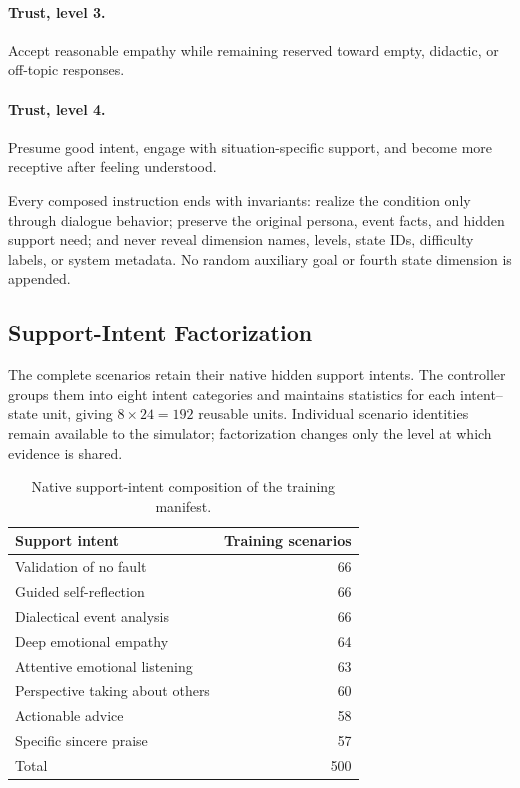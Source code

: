 \paragraph{Trust, level 3.}
Accept reasonable empathy while remaining reserved toward empty, didactic, or
off-topic responses.
\paragraph{Trust, level 4.}
Presume good intent, engage with situation-specific support, and become more
receptive after feeling understood.

Every composed instruction ends with invariants: realize the condition only
through dialogue behavior; preserve the original persona, event facts, and
hidden support need; and never reveal dimension names, levels, state IDs,
difficulty labels, or system metadata. No random auxiliary goal or fourth state
dimension is appended.

\subsection{Support-Intent Factorization}
The complete scenarios retain their native hidden support intents. The
controller groups them into eight intent categories and maintains statistics
for each intent--state unit, giving $8\times24=192$ reusable units. Individual
scenario identities remain available to the simulator; factorization changes
only the level at which evidence is shared.

\begin{table}[t]
\centering
\small
\begin{tabular}{lr}
\toprule
Support intent & Training scenarios \\
\midrule
Validation of no fault & 66 \\
Guided self-reflection & 66 \\
Dialectical event analysis & 66 \\
Deep emotional empathy & 64 \\
Attentive emotional listening & 63 \\
Perspective taking about others & 60 \\
Actionable advice & 58 \\
Specific sincere praise & 57 \\
\midrule
Total & 500 \\
\bottomrule
\end{tabular}
\caption{Native support-intent composition of the training manifest.}
\label{tab:supp-training-intents}
\end{table}

